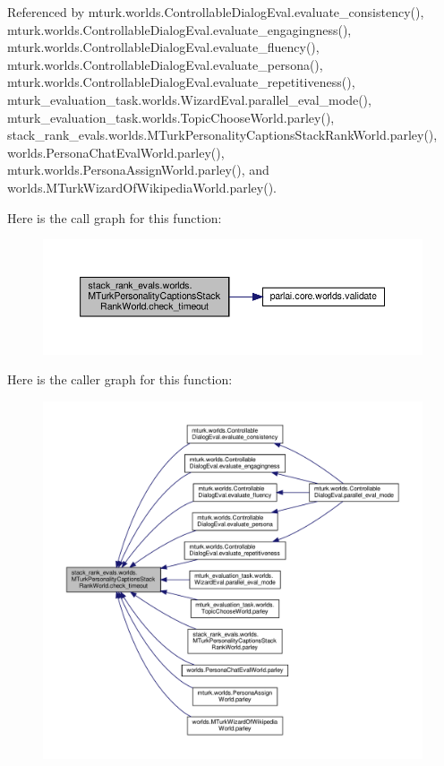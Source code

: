 Referenced by mturk.\+worlds.\+Controllable\+Dialog\+Eval.\+evaluate\+\_\+consistency(), mturk.\+worlds.\+Controllable\+Dialog\+Eval.\+evaluate\+\_\+engagingness(), mturk.\+worlds.\+Controllable\+Dialog\+Eval.\+evaluate\+\_\+fluency(), mturk.\+worlds.\+Controllable\+Dialog\+Eval.\+evaluate\+\_\+persona(), mturk.\+worlds.\+Controllable\+Dialog\+Eval.\+evaluate\+\_\+repetitiveness(), mturk\+\_\+evaluation\+\_\+task.\+worlds.\+Wizard\+Eval.\+parallel\+\_\+eval\+\_\+mode(), mturk\+\_\+evaluation\+\_\+task.\+worlds.\+Topic\+Choose\+World.\+parley(), stack\+\_\+rank\+\_\+evals.\+worlds.\+M\+Turk\+Personality\+Captions\+Stack\+Rank\+World.\+parley(), worlds.\+Persona\+Chat\+Eval\+World.\+parley(), mturk.\+worlds.\+Persona\+Assign\+World.\+parley(), and worlds.\+M\+Turk\+Wizard\+Of\+Wikipedia\+World.\+parley().

Here is the call graph for this function\+:
\nopagebreak
\begin{figure}[H]
\begin{center}
\leavevmode
\includegraphics[width=350pt]{classstack__rank__evals_1_1worlds_1_1MTurkPersonalityCaptionsStackRankWorld_a60ac9e09fd5c55d81fafc0a86794716b_cgraph}
\end{center}
\end{figure}
Here is the caller graph for this function\+:
\nopagebreak
\begin{figure}[H]
\begin{center}
\leavevmode
\includegraphics[width=350pt]{classstack__rank__evals_1_1worlds_1_1MTurkPersonalityCaptionsStackRankWorld_a60ac9e09fd5c55d81fafc0a86794716b_icgraph}
\end{center}
\end{figure}
